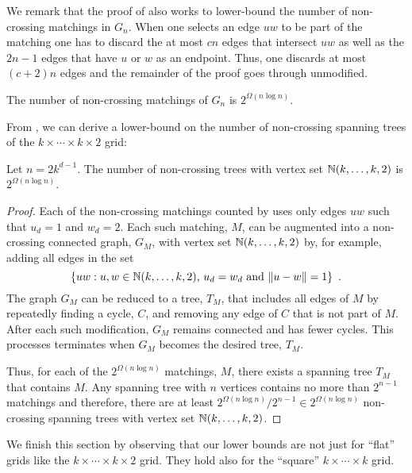 \documentclass{patmorin}
\begin{document}
We remark that the proof of  also works to lower-bound
the number of non-crossing matchings in $G_n$.  When one selects an edge
$uw$ to be part of the matching one has to discard the at most $cn$
edges that intersect $uw$ as well as the $2n-1$ edges that have $u$
or $w$ as an endpoint.  Thus, one discards at most $(c+2)n$ edges and
the remainder of the proof goes through unmodified.

\begin{cor}
  The number of non-crossing matchings of $G_n$ is $2^{\Omega(n\log n)}$.
\end{cor}

From , we can derive a lower-bound on the number of
non-crossing spanning trees of the $k\times\cdots\times k\times 2$ grid:
\begin{cor}
  Let $n=2k^{d-1}$.  The number of non-crossing trees with vertex set
  $\mathbb{N}(k,\ldots,k,2)$ is $2^{\Omega(n\log n)}$.
\end{cor}

\begin{proof}
  Each of the non-crossing matchings counted by  uses
  only edges $uw$ such that $u_d=1$ and $w_d=2$.  Each such matching,
  $M$, can be augmented into a non-crossing connected graph, $G_M$,
  with vertex set $\mathbb{N}(k,\ldots,k,2)$ by, for example, adding all edges
  in the set
  \[
     \{ uw :\mbox{$u,w\in \mathbb{N}(k,\ldots,k,2)$, $u_d=w_d$ and $\|u-w\|=1$} \} \enspace .  
  \] 
  The graph $G_M$ can be reduced to a tree, $T_M$, that includes all edges
  of $M$ by repeatedly finding a cycle, $C$, and removing any edge of $C$
  that is not part of $M$.  After each such modification, $G_M$ remains
  connected and has fewer cycles.  This processes terminates when $G_M$
  becomes the desired tree, $T_M$.

  Thus, for each of the $2^{\Omega(n\log n)}$ matchings, $M$, there
  exists a spanning tree $T_M$ that contains $M$.  Any spanning tree
  with $n$ vertices contains no more than $2^{n-1}$ matchings and therefore,
  there are at least $2^{\Omega(n\log n)}/2^{n-1}\in 2^{\Omega(n\log n)}$
  non-crossing spanning trees with vertex set $\mathbb{N}(k,\ldots,k,2)$.
\end{proof}

We finish this section by observing that our lower bounds are not
just for ``flat'' grids like the $k\times\cdots\times k\times 2$ grid.
They hold also for the ``square'' $k\times\cdots\times k$ grid.
\end{document}
